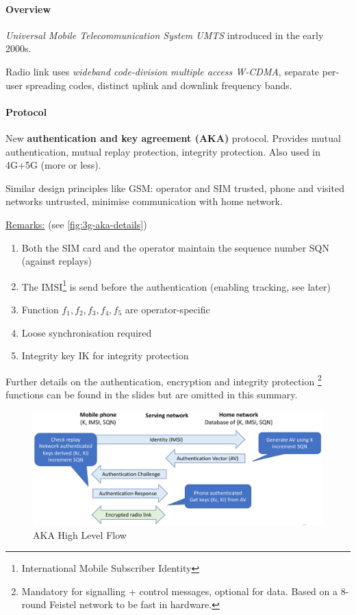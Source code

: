 \paragraph{Overview}
\textit{Universal Mobile Telecommunication System UMTS} introduced in the early 2000s.

Radio link uses \textit{wideband code-division multiple access W-CDMA}, separate per-user spreading codes, distinct uplink and downlink frequency bands.

\paragraph{Protocol}
New \textbf{authentication and key agreement (AKA)} protocol.
Provides mutual authentication, mutual replay protection, integrity protection.
Also used in 4G+5G (more or less).

Similar design principles like GSM: operator and SIM trusted, phone and visited networks untrusted, minimise communication with home network.

\underline{Remarks:} (see \autoref{fig:3g-aka-details})
\begin{enumerate}
	\item Both the SIM card and the operator maintain the sequence number SQN (against replays)
	\item The IMSI\footnote{International Mobile Subscriber Identity} is send before the authentication (enabling tracking, see later)
	\item Function $f_1, f_2, f_3, f_4, f_5$ are operator-specific
	\item Loose synchronisation required
	\item Integrity key IK for integrity protection
\end{enumerate}

Further details on the authentication, encryption and integrity protection%
\footnote{Mandatory for signalling + control messages, optional for data. Based on a 8-round Feistel network to be fast in hardware.}
functions can be found in the slides but are omitted in this summary.

\begin{figure}
	\centering
	\includegraphics[scale=0.4]{images/10-3g-aka-overview.png}
	\caption{AKA High Level Flow}
	\label{fig:3g-aka-overview}
\end{figure}

